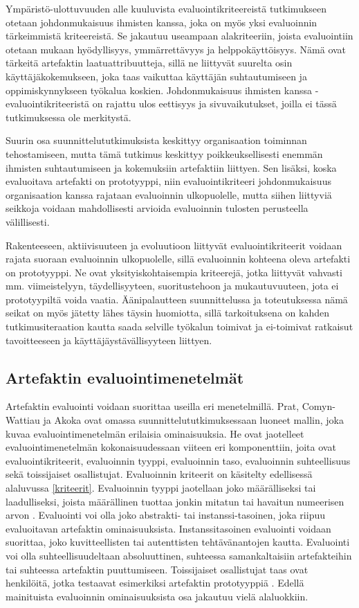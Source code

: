 \documentclass[utf8]{gradu3}
\begin{document}
Ympäristö-ulottuvuuden alle kuuluvista evaluointikriteereistä tutkimukseen otetaan johdonmukaisuus ihmisten kanssa, joka on myös yksi evaluoinnin tärkeimmistä kriteereistä. Se jakautuu useampaan alakriteeriin, joista evaluointiin otetaan mukaan hyödyllisyys, ymmärrettävyys ja helppokäyttöisyys. Nämä ovat tärkeitä artefaktin laatuattribuutteja, sillä ne liittyvät suurelta osin käyttäjäkokemukseen, joka taas vaikuttaa käyttäjän suhtautumiseen ja oppimiskynnykseen työkalua koskien. Johdonmukaisuus ihmisten kanssa -evaluointikriteeristä on rajattu ulos eettisyys ja sivuvaikutukset, joilla ei tässä tutkimuksessa ole merkitystä.

Suurin osa suunnittelututkimuksista keskittyy organisaation toiminnan tehostamiseen, mutta tämä tutkimus keskittyy poikkeuksellisesti enemmän ihmisten suhtautumiseen ja kokemuksiin artefaktiin liittyen. Sen lisäksi, koska evaluoitava artefakti on prototyyppi, niin evaluointikriteeri johdonmukaisuus organisaation kanssa rajataan evaluoinnin ulkopuolelle, mutta siihen liittyviä seikkoja voidaan mahdollisesti arvioida evaluoinnin tulosten perusteella välillisesti. 

Rakenteeseen, aktiivisuuteen ja evoluutioon liittyvät evaluointikriteerit voidaan rajata suoraan evaluoinnin ulkopuolelle, sillä evaluoinnin kohteena oleva artefakti on prototyyppi. Ne ovat yksityiskohtaisempia kriteerejä, jotka liittyvät vahvasti mm. viimeistelyyn, täydellisyyteen, suoritustehoon ja mukautuvuuteen, jota ei prototyypiltä voida vaatia. Äänipalautteen suunnittelussa ja toteutuksessa nämä seikat on myös jätetty lähes täysin huomiotta, sillä tarkoituksena on kahden tutkimusiteraation kautta saada selville työkalun toimivat ja ei-toimivat ratkaisut tavoitteeseen ja käyttäjäystävällisyyteen liittyen.

\subsection{Artefaktin evaluointimenetelmät}

Artefaktin evaluointi voidaan suorittaa useilla eri menetelmillä.  Prat, Comyn-Wattiau ja Akoka \parencite[][]{evaluation} ovat omassa suunnittelututkimuksessaan luoneet mallin, joka kuvaa evaluointimenetelmän erilaisia ominaisuuksia. He ovat jaotelleet evaluointimenetelmän kokonaisuudessaan viiteen eri komponenttiin, joita ovat evaluointikriteerit, evaluoinnin tyyppi, evaluoinnin taso, evaluoinnin suhteellisuus sekä toissijaiset osallistujat. Evaluoinnin kriteerit on käsitelty edellisessä alaluvussa \ref{kriteerit}. Evaluoinnin tyyppi jaotellaan joko määrälliseksi tai laadulliseksi, joista määrällinen tuottaa jonkin mitatun tai havaitun numeerisen arvon \parencite[][]{evaluation}. Evaluointi voi olla joko abstrakti- tai instanssi-tasoinen, joka riipuu evaluoitavan artefaktin ominaisuuksista. Instanssitasoinen evaluointi voidaan suorittaa, joko kuvitteellisten tai autenttisten tehtävänantojen kautta. Evaluointi voi olla suhteellisuudeltaan absoluuttinen, suhteessa samankaltaisiin artefakteihin tai suhteessa artefaktin puuttumiseen. Toissijaiset osallistujat taas ovat henkilöitä, jotka testaavat esimerkiksi artefaktin prototyyppiä \parencite[][]{evaluation}. Edellä mainituista evaluoinnin ominaisuuksista osa jakautuu vielä alaluokkiin.
\end{document}
